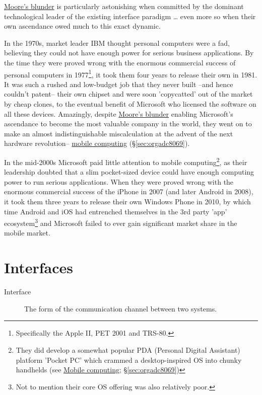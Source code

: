 \documentclass[logo,bsc,singlespacing,parskip]{infthesis}
\begin{document}
\hyperref[org86a798e]{Moore's blunder} is particularly astonishing when committed by the dominant technological leader of the existing interface paradigm \ldots{} even more so when their own ascendance owed much to this exact dynamic.

In the 1970s, market leader IBM thought personal computers were a fad, believing they could not have enough power for serious business applications.
By the time they were proved wrong with the enormous commercial success of personal computers in 1977\footnote{Specifically the Apple II, PET 2001 and TRS-80.}, it took them four years to release their own in 1981. It was such a rushed and low-budget job that they never built --and hence couldn't patent-- their own chipset and were soon 'copycatted' out of the market by cheap clones, to the eventual benefit of Microsoft who licensed the software on all these devices.
Amazingly, despite \hyperref[org86a798e]{Moore's blunder} enabling Microsoft's ascendance to become the most valuable company in the world, they went on to make an almost indistinguishable miscalculation at the advent of the next hardware revolution-- \hyperref[sec:orgadc8069]{mobile computing} (\S \ref{sec:orgadc8069}).

In the mid-2000s Microsoft paid little attention to mobile computing\footnote{They did develop a somewhat popular PDA (Personal Digital Assistant) platform 'Pocket PC' which crammed a desktop-inspired OS into chunky handhelds (see \hyperref[sec:orgadc8069]{Mobile computing}; \S \ref{sec:orgadc8069})}, as their leadership doubted that a slim pocket-sized device could have enough computing power to run serious applications.
When they were proved wrong with the enormous commercial success of the iPhone in 2007 (and later Android in 2008), it took them three years to release their own Windows Phone in 2010, by which time Android and iOS had entrenched themselves in the 3rd party 'app' ecosystem\footnote{Not to mention their core OS offering was also relatively poor.} and Microsoft failed to ever gain significant market share in the mobile market.

\chapter{Interfaces}
\label{sec:orgd446ca7}
\begin{mdframed}
\begin{description}
\item[{Interface\label{Interface}}] The form of the communication channel between two systems.
\end{description}
\end{mdframed}
\end{document}
